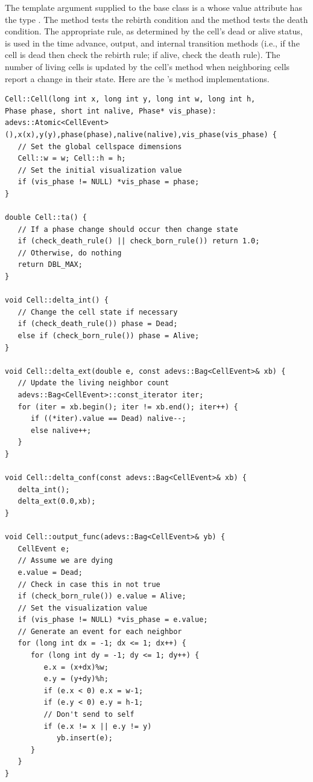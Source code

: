The template argument supplied to the base  class is a  whose value attribute has the type . The  method tests the rebirth condition and the  method tests the death condition. The appropriate rule, as determined by the cell's dead or alive status, is used in the time advance, output, and internal transition methods (i.e., if the cell is dead then check the rebirth rule; if alive, check the death rule). The number of living cells is updated by the cell's  method when neighboring cells report a change in their state. Here are the 's method implementations.
\begin{verbatim}
Cell::Cell(long int x, long int y, long int w, long int h, 
Phase phase, short int nalive, Phase* vis_phase):
adevs::Atomic<CellEvent>(),x(x),y(y),phase(phase),nalive(nalive),vis_phase(vis_phase) {
   // Set the global cellspace dimensions
   Cell::w = w; Cell::h = h;
   // Set the initial visualization value
   if (vis_phase != NULL) *vis_phase = phase;
}

double Cell::ta() {
   // If a phase change should occur then change state 
   if (check_death_rule() || check_born_rule()) return 1.0;
   // Otherwise, do nothing
   return DBL_MAX;
}

void Cell::delta_int() { 
   // Change the cell state if necessary
   if (check_death_rule()) phase = Dead;
   else if (check_born_rule()) phase = Alive;
}

void Cell::delta_ext(double e, const adevs::Bag<CellEvent>& xb) {
   // Update the living neighbor count 
   adevs::Bag<CellEvent>::const_iterator iter;
   for (iter = xb.begin(); iter != xb.end(); iter++) {
      if ((*iter).value == Dead) nalive--;
      else nalive++;
   }
}

void Cell::delta_conf(const adevs::Bag<CellEvent>& xb) { 
   delta_int();
   delta_ext(0.0,xb);
}

void Cell::output_func(adevs::Bag<CellEvent>& yb) { 
   CellEvent e;
   // Assume we are dying
   e.value = Dead;
   // Check in case this in not true
   if (check_born_rule()) e.value = Alive;
   // Set the visualization value
   if (vis_phase != NULL) *vis_phase = e.value;
   // Generate an event for each neighbor
   for (long int dx = -1; dx <= 1; dx++) {
      for (long int dy = -1; dy <= 1; dy++) {
         e.x = (x+dx)%w;
         e.y = (y+dy)%h;
         if (e.x < 0) e.x = w-1;
         if (e.y < 0) e.y = h-1;
         // Don't send to self
         if (e.x != x || e.y != y)
            yb.insert(e);
      }
   }
}
\end{verbatim}

